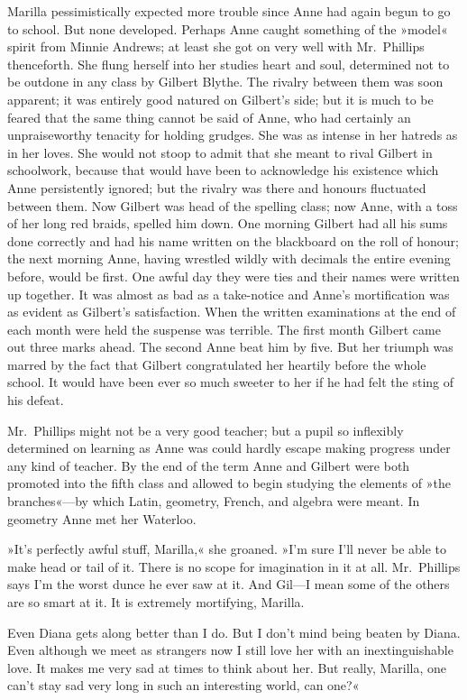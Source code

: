 Marilla pessimistically expected more trouble since Anne had again begun to go to school. But none developed. Perhaps Anne caught something of the »model« spirit from Minnie Andrews; at least she got on very well with Mr.~Phillips thenceforth. She flung herself into her studies heart and soul, determined not to be outdone in any class by Gilbert Blythe. The rivalry between them was soon apparent; it was entirely good natured on Gilbert's side; but it is much to be feared that the same thing cannot be said of Anne, who had certainly an unpraiseworthy tenacity for holding grudges. She was as intense in her hatreds as in her loves. She would not stoop to admit that she meant to rival Gilbert in schoolwork, because that would have been to acknowledge his existence which Anne persistently ignored; but the rivalry was there and honours fluctuated between them. Now Gilbert was head of the spelling class; now Anne, with a toss of her long red braids, spelled him down. One morning Gilbert had all his sums done correctly and had his name written on the blackboard on the roll of honour; the next morning Anne, having wrestled wildly with decimals the entire evening before, would be first. One awful day they were ties and their names were written up together. It was almost as bad as a take-notice and Anne's mortification was as evident as Gilbert's satisfaction. When the written examinations at the end of each month were held the suspense was terrible. The first month Gilbert came out three marks ahead. The second Anne beat him by five. But her triumph was marred by the fact that Gilbert congratulated her heartily before the whole school. It would have been ever so much sweeter to her if he had felt the sting of his defeat.

Mr.~Phillips might not be a very good teacher; but a pupil so inflexibly determined on learning as Anne was could hardly escape making progress under any kind of teacher. By the end of the term Anne and Gilbert were both promoted into the fifth class and allowed to begin studying the elements of »the branches«—by which Latin, geometry, French, and algebra were meant. In geometry Anne met her Waterloo.

»It's perfectly awful stuff, Marilla,« she groaned. »I'm sure I'll never be able to make head or tail of it. There is no scope for imagination in it at all. Mr.~Phillips says I'm the worst dunce he ever saw at it. And Gil—I mean some of the others are so smart at it. It is extremely mortifying, Marilla.

Even Diana gets along better than I do. But I don't mind being beaten by Diana. Even although we meet as strangers now I still love her with an inextinguishable love. It makes me very sad at times to think about her. But really, Marilla, one can't stay sad very long in such an interesting world, can one?«